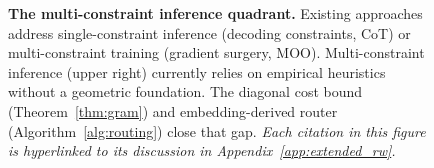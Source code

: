 \begin{figure}[!htb]
\caption{\textbf{The multi-constraint inference quadrant.} Existing approaches address single-constraint inference (decoding constraints, CoT) or multi-constraint training (gradient surgery, MOO). Multi-constraint inference (upper right) currently relies on empirical heuristics without a geometric foundation. The diagonal cost bound (Theorem~\ref{thm:gram}) and embedding-derived router (Algorithm~\ref{alg:routing}) close that gap. \emph{Each citation in this figure is hyperlinked to its discussion in Appendix~\ref{app:extended_rw}.}}
\label{fig:rw_quadrant}
\end{figure}
